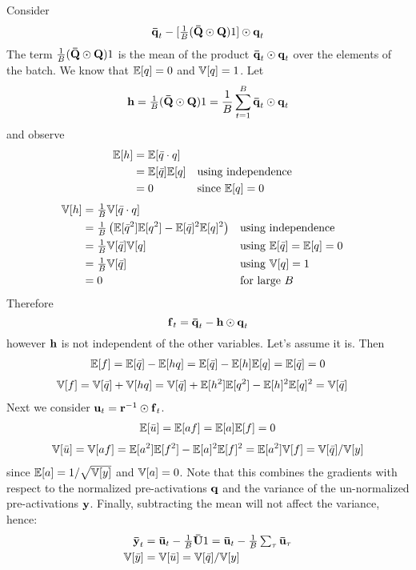 Consider
\begin{align}
\boldsymbol{\mathbf{\bar{q}}}_{t} - [\tfrac{1}{B} (\boldsymbol{\mathbf{\bar{Q}}} \odot \boldsymbol{\mathbf{Q}}) 1] \odot \boldsymbol{\mathbf{q}}_{t}
\end{align}
The term $\tfrac{1}{B} (\boldsymbol{\mathbf{\bar{Q}}} \odot \boldsymbol{\mathbf{Q}}) 1$ is the mean of the product $\boldsymbol{\mathbf{\bar{q}}}_{t} \odot \boldsymbol{\mathbf{q}}_{t}$ over the elements of the batch.
We know that $\mathbb{E}[q] = 0$ and $\mathbb{V}[q] = 1$.
Let
\begin{equation}
\boldsymbol{\mathbf{h}} = \tfrac{1}{B} (\boldsymbol{\mathbf{\bar{Q}}} \odot \boldsymbol{\mathbf{Q}}) 1 = \frac{1}{B} \sum_{t = 1}^{B} \boldsymbol{\mathbf{\bar{q}}}_{t} \odot \boldsymbol{\mathbf{q}}_{t}
\end{equation}
and observe
\begin{align}
\mathbb{E}[h] & = \mathbb{E}[\bar{q} \cdot q] \\
& = \mathbb{E}[\bar{q}] \mathbb{E}[q] && \text{using independence} \\
& = 0 && \text{since $\mathbb{E}[q] = 0$}
\end{align}
\begin{align}
\mathbb{V}[h] & = \tfrac{1}{B} \mathbb{V}[\bar{q} \cdot q] \\
& = \tfrac{1}{B} \left( \mathbb{E}[\bar{q}^2] \mathbb{E}[q^2] - \mathbb{E}[\bar{q}]^2 \mathbb{E}[q]^2 \right) && \text{using independence} \\
& = \tfrac{1}{B} \mathbb{V}[\bar{q}] \mathbb{V}[q] && \text{using $\mathbb{E}[\bar{q}] = \mathbb{E}[q] = 0$} \\
& = \tfrac{1}{B} \mathbb{V}[\bar{q}] && \text{using $\mathbb{V}[q] = 1$} \\
& = 0 && \text{for large $B$}
\end{align}
Therefore
\begin{equation}
\boldsymbol{\mathbf{f}}_{t} = \boldsymbol{\mathbf{\bar{q}}}_{t} - \boldsymbol{\mathbf{h}} \odot \boldsymbol{\mathbf{q}}_{t}
\end{equation}
however $\boldsymbol{\mathbf{h}}$ is not independent of the other variables.
Let's assume it is.
Then
\begin{align}
\mathbb{E}[f] = \mathbb{E}[\bar{q}] - \mathbb{E}[h q] = \mathbb{E}[\bar{q}] - \mathbb{E}[h] \mathbb{E}[q] = \mathbb{E}[\bar{q}] = 0
\end{align}
\begin{align}
\mathbb{V}[f] = \mathbb{V}[\bar{q}] + \mathbb{V}[h q] & = \mathbb{V}[\bar{q}] + \mathbb{E}[h^2] \mathbb{E}[q^2] - \mathbb{E}[h]^2 \mathbb{E}[q]^2 = \mathbb{V}[\bar{q}]
\end{align}
Next we consider $\boldsymbol{\mathbf{u}}_{t} = \boldsymbol{\mathbf{r}}^{-1} \odot \boldsymbol{\mathbf{f}}_{t}$.
\begin{align}
\mathbb{E}[\bar{u}] = \mathbb{E}[a f] = \mathbb{E}[a] \mathbb{E}[f] = 0
\end{align}
\begin{align}
\mathbb{V}[\bar{u}] = \mathbb{V}[a f] = \mathbb{E}[a^2] \mathbb{E}[f^2] - \mathbb{E}[a]^2 \mathbb{E}[f]^2 = \mathbb{E}[a^2] \mathbb{V}[f] = \mathbb{V}[\bar{q}] / \mathbb{V}[y]
\end{align}
since $\mathbb{E}[a] = 1/\sqrt{\mathbb{V}[y]}$ and $\mathbb{V}[a] = 0$.
Note that this combines the gradients with respect to the normalized pre-activations $\boldsymbol{\mathbf{q}}$ and the variance of the un-normalized pre-activations $\boldsymbol{\mathbf{y}}$.
Finally, subtracting the mean will not affect the variance, hence:
\begin{align}
\boldsymbol{\mathbf{\bar{y}}}_{t} & = \boldsymbol{\mathbf{\bar{u}}}_{t} - \tfrac{1}{B} \boldsymbol{\mathbf{\bar{U}}} 1
= \boldsymbol{\mathbf{\bar{u}}}_{t} - \textstyle \frac{1}{B} \sum_{\tau} \boldsymbol{\mathbf{\bar{u}}}_{\tau} \\
\mathbb{V}[\bar{y}] & = \mathbb{V}[\bar{u}] = \mathbb{V}[\bar{q}] / \mathbb{V}[y]
\end{align}

